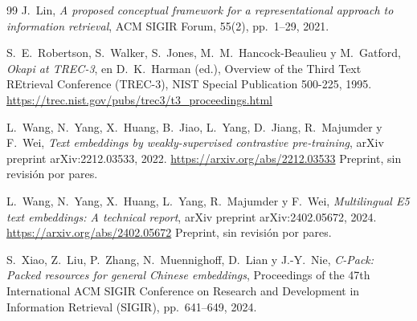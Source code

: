\documentclass[11pt,letterpaper]{article}
\numberwithin{equation}{section}
\begin{document}
\begin{thebibliography}{99}
J.~Lin,
\textit{A proposed conceptual framework for a representational approach to information retrieval},
ACM SIGIR Forum, 55(2), pp.~1--29, 2021.

S.~E.~Robertson, S.~Walker, S.~Jones, M.~M.~Hancock-Beaulieu y M.~Gatford,
\textit{Okapi at {TREC}-3},
en D.~K.~Harman (ed.), Overview of the Third Text REtrieval Conference (TREC-3), NIST Special Publication 500-225, 1995.
\url{https://trec.nist.gov/pubs/trec3/t3_proceedings.html}

L.~Wang, N.~Yang, X.~Huang, B.~Jiao, L.~Yang, D.~Jiang, R.~Majumder y F.~Wei,
\textit{Text embeddings by weakly-supervised contrastive pre-training},
arXiv preprint arXiv:2212.03533, 2022.
\url{https://arxiv.org/abs/2212.03533} Preprint, sin revisión por pares.

L.~Wang, N.~Yang, X.~Huang, L.~Yang, R.~Majumder y F.~Wei,
\textit{Multilingual {E5} text embeddings: A technical report},
arXiv preprint arXiv:2402.05672, 2024.
\url{https://arxiv.org/abs/2402.05672} Preprint, sin revisión por pares.

S.~Xiao, Z.~Liu, P.~Zhang, N.~Muennighoff, D.~Lian y J.-Y.~Nie,
\textit{{C-Pack}: Packed resources for general {C}hinese embeddings},
Proceedings of the 47th International ACM SIGIR Conference on Research and Development in Information Retrieval (SIGIR), pp.~641--649, 2024.


\end{thebibliography}
\end{document}
